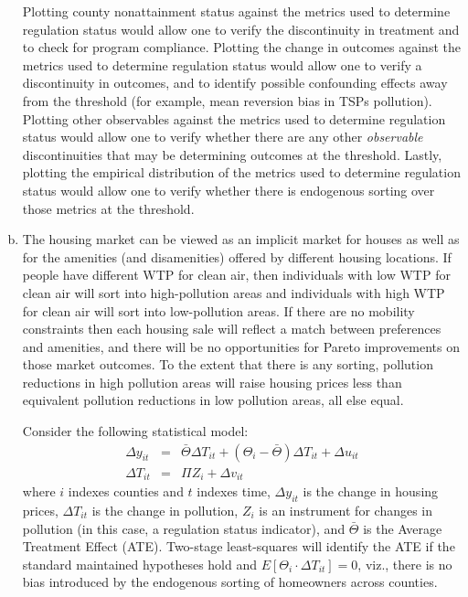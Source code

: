 \documentclass{article}
\begin{document}
\begin{enumerate}[(a)]
Plotting county nonattainment status against the metrics used to determine regulation status would allow one to verify the discontinuity in treatment and to check for program compliance. Plotting the change in outcomes against the metrics used to determine regulation status would allow one to verify a discontinuity in outcomes, and to identify possible confounding effects away from the threshold (for example, mean reversion bias in TSPs pollution). Plotting other observables against the metrics used to determine regulation status would allow one to verify whether there are any other {\em observable} discontinuities that may be determining outcomes at the threshold. Lastly, plotting the empirical distribution of the metrics used to determine regulation status would allow one to verify whether there is endogenous sorting over those metrics at the threshold.

\item The housing market can be viewed as an implicit market for houses as well as for the amenities (and disamenities) offered by different housing locations. If people have different WTP for clean air, then individuals with low WTP for clean air will sort into high-pollution areas and individuals with high WTP for clean air will sort into low-pollution areas. If there are no mobility constraints then each housing sale will reflect a match between preferences and amenities, and there will be no opportunities for Pareto improvements on those market outcomes. To the extent that there is any sorting, pollution reductions in high pollution areas will raise housing prices less than equivalent pollution reductions in low pollution areas, all else equal.

Consider the following statistical model:
\begin{eqnarray}
\Delta{}y_{it} &= &\bar{\Theta}\Delta{}T_{it}+\left( \Theta_{i}-\bar{\Theta}\right)\Delta{}T_{it}+\Delta{}u_{it} \\
\Delta{}T_{it} &= &\Pi Z_{i}+\Delta{}v_{it}
\end{eqnarray}
where $i$ indexes counties and $t$ indexes time, $\Delta{}y_{it}$ is the change in housing prices, $\Delta{}T_{it}$ is the change in pollution, $Z_{i}$ is an instrument for changes in pollution (in this case, a regulation status indicator), and $\bar{\Theta}$ is the Average Treatment Effect (ATE). Two-stage least-squares will identify the ATE if the standard maintained hypotheses hold and $E\left[\Theta_{i} \cdot \Delta{}T_{it}\right]=0$, viz., there is no bias introduced by the endogenous sorting of homeowners across counties.


\end{enumerate}
\end{document}
